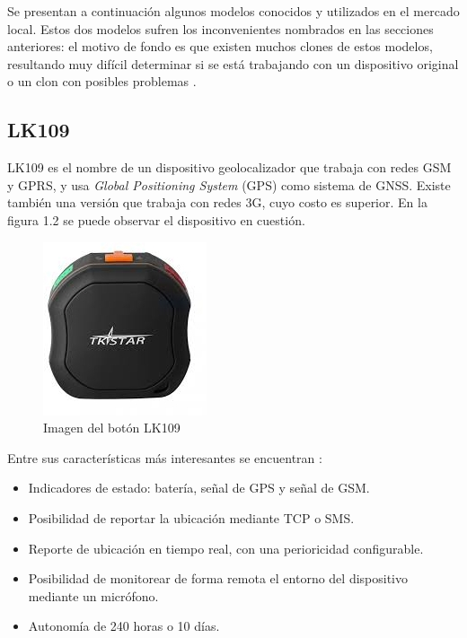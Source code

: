 Se presentan a continuación algunos modelos conocidos y utilizados en el mercado local. Estos dos modelos sufren los inconvenientes nombrados en las secciones anteriores: el motivo de fondo es que existen muchos clones de estos modelos, resultando muy difícil determinar si se está trabajando con un dispositivo original o un clon con posibles problemas \citep{CLONES:1}.
\subsection{LK109}

LK109 es el nombre de un dispositivo geolocalizador que trabaja con redes GSM y GPRS, y usa \textit{Global Positioning System} (GPS) como sistema de GNSS. Existe también una versión que trabaja con redes 3G, cuyo costo es superior. En la figura 1.2 se puede observar el dispositivo en cuestión.

\begin{figure}[H]
	\centering
	\includegraphics[width=.6\textwidth]{./Figures/lk109.jpg}
	\caption{Imagen del botón LK109}
	\label{fig:texmaker}
\end{figure}
Entre sus características más interesantes se encuentran \citep{LK109MANUAL:1}:
\begin{itemize}
\item Indicadores de estado: batería, señal de GPS y señal de GSM.
\item Posibilidad de reportar la ubicación mediante TCP o SMS.
\item Reporte de ubicación en tiempo real, con una perioricidad configurable.
\item Posibilidad de monitorear de forma remota el entorno del dispositivo mediante un micrófono.
\item Autonomía de 240 horas o 10 días.
\end{itemize}



